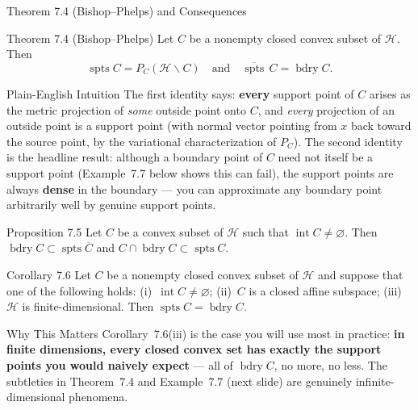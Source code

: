\documentclass[aspectratio=169,10pt]{beamer}
\DeclareMathOperator{\spts}{spts}
\DeclareMathOperator{\bdry}{bdry}
\DeclareMathOperator{\Int}{int}
\newcommand{\Hil}{\mathcal{H}}
\newcommand{\closure}[1]{\overline{#1}}
\begin{document}
\begin{frame}[allowframebreaks]{Theorem 7.4 (Bishop--Phelps) and Consequences}

  \begin{block}{Theorem 7.4 (Bishop--Phelps)}
    Let $C$ be a nonempty closed convex subset of $\Hil$. Then
    \[
      \spts C = P_C(\Hil \smallsetminus C) \quad \text{and} \quad
      \closure{\spts}\,C = \bdry C. \tag{7.3}
    \]
  \end{block}

  \begin{block}{Plain-English Intuition}
    The first identity says: \textbf{every} support point of $C$ arises as
    the metric projection of \emph{some} outside point onto $C$, and
    \emph{every} projection of an outside point is a support point (with
    normal vector pointing from $x$ back toward the source point, by the
    variational characterization of $P_C$). The second identity is the
    headline result: although a boundary point of $C$ need not itself be a
    support point (Example~7.7 below shows this can fail), the support
    points are always \textbf{dense} in the boundary --- you can approximate
    any boundary point arbitrarily well by genuine support points.
  \end{block}

  \framebreak

  \begin{block}{Proposition 7.5}
    Let $C$ be a convex subset of $\Hil$ such that $\Int C \ne \varnothing$.
    Then $\bdry C \subset \spts \closure{C}$ and
    $C \cap \bdry C \subset \spts C$.
  \end{block}

  \begin{block}{Corollary 7.6}
    Let $C$ be a nonempty closed convex subset of $\Hil$ and suppose that one
    of the following holds: (i)~$\Int C \ne \varnothing$; (ii)~$C$ is a closed
    affine subspace; (iii)~$\Hil$ is finite-dimensional. Then
    $\spts C = \bdry C$.
  \end{block}

  \begin{block}{Why This Matters}
    Corollary~7.6(iii) is the case you will use most in practice: \textbf{in
    finite dimensions, every closed convex set has exactly the support
    points you would naively expect} --- all of $\bdry C$, no more, no less.
    The subtleties in Theorem~7.4 and Example~7.7 (next slide) are genuinely
    infinite-dimensional phenomena.
  \end{block}

\end{frame}
\end{document}
